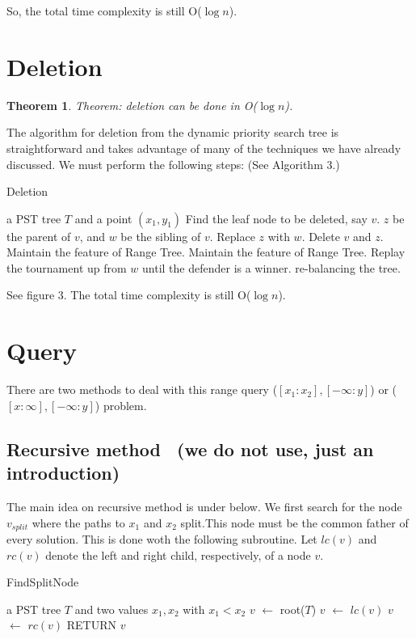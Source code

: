 \documentclass{acm_proc_article-sp}
\newtheorem{theorem}{Theorem}
\begin{document}
So, the total time complexity is still O($\log n$).
\section{Deletion}

\begin{theorem}
Theorem: deletion can be done in O($\log n$).
\end{theorem}

The algorithm for deletion from the dynamic priority search tree is
straightforward and takes advantage of many of the techniques we
have already discussed. We must perform the following steps: (See
Algorithm 3.)
\begin{algorithm}[!h]
\caption{Deletion} \label{alg:pst_delete}
    \begin{algorithmic}[1]
    \REQUIRE a PST tree $T$ and a point $(x_1,y_1)$
    \STATE Find the leaf node to be deleted, say $v$. $z$ be the parent of $v$, and $w$ be the sibling of $v$.
    \STATE Replace $z$ with $w$. Delete $v$ and $z$.
    \STATE Maintain the feature of Range Tree.
    \STATE Maintain the feature of Range Tree.
    Replay the tournament up from $w$ until the defender is a winner.
    \STATE re-balancing the tree.
    \end{algorithmic}
\end{algorithm}
See figure 3. The total time complexity is still O($\log n$).

\section{Query}
There are two methods to deal with this range query
($[x_1:x_2],[-\infty:y]$) or ($[x:\infty],[-\infty:y]$) problem.
\subsection{Recursive method~\cite{CG_02} (we do not use, just an introduction)}
The main idea on recursive method is under below. We first search
for the node $v_{split}$ where the paths to $x_1$ and $x_2$
split.This node must be the common father of every solution. This is
done woth the following subroutine. Let $lc(v)$ and $rc(v)$ denote
the left and right child, respectively, of a node $v$.

\begin{algorithm}[!h]
\caption{FindSplitNode} \label{alg:find split node}
    \begin{algorithmic}[1]
    \REQUIRE a PST tree $T$ and two values $x_1,x_2$ with $x_1<x_2$
    \STATE $v$ $\leftarrow$ root($T$)
        \STATE $v$ $\leftarrow$ $lc(v)$
        \ELSE
        \STATE $v$ $\leftarrow$ $rc(v)$
        \ENDIF
    \ENDWHILE
    \STATE RETURN $v$
    \end{algorithmic}
\end{algorithm}
\end{document}
